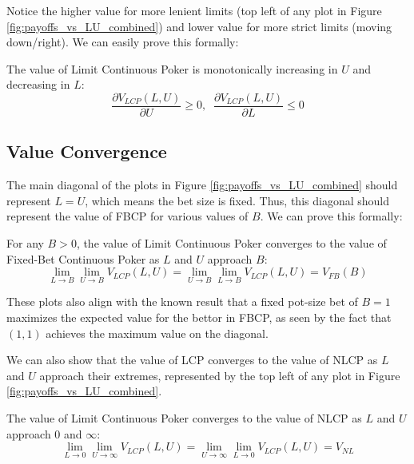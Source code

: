 \documentclass[../../main/main.tex]{subfiles}
\begin{document}
Notice the higher value for more lenient limits (top left of any plot in Figure \ref{fig:payoffs_vs_LU_combined}) and lower value for more strict limits (moving down/right). We can easily prove this formally:

\begin{theorem}
    The value of Limit Continuous Poker is monotonically increasing in $U$ and decreasing in $L$:
\[
    \frac{\partial V_{LCP}(L, U)}{\partial U} \geq 0, \;\; \frac{\partial V_{LCP}(L, U)}{\partial L} \leq 0
\]
\end{theorem}
\begin{customproof}
\end{customproof}

\subsection{Value Convergence}

The main diagonal of the plots in Figure \ref{fig:payoffs_vs_LU_combined} should represent $L=U$, which means the bet size is fixed. Thus, this diagonal should represent the value of FBCP for various values of $B$. We can prove this formally:

\begin{theorem}
    For any $B > 0$, the value of Limit Continuous Poker converges to the value of Fixed-Bet Continuous Poker as $L$ and $U$ approach $B$:
\[
\lim_{L \to B} \lim_{U \to B} V_{LCP}(L, U) = \lim_{U \to B} \lim_{L \to B} V_{LCP}(L, U) = V_{FB}(B)
\]
\end{theorem}

\begin{customproof}
\end{customproof}

These plots also align with the known result that a fixed pot-size bet of $B=1$ maximizes the expected value for the bettor in FBCP, as seen by the fact that $(1, 1)$ achieves the maximum value on the diagonal. 

We can also show that the value of LCP converges to the value of NLCP as $L$ and $U$ approach their extremes, represented by the top left of any plot in Figure \ref{fig:payoffs_vs_LU_combined}.

\begin{theorem}
    The value of Limit Continuous Poker converges to the value of NLCP as $L$ and $U$ approach $0$ and $\infty$:
\[
\lim_{L \to 0} \lim_{U \to \infty} V_{LCP}(L, U) = \lim_{U \to \infty} \lim_{L \to 0} V_{LCP}(L, U) = V_{NL}
\]
\end{theorem}
\begin{customproof}
\end{customproof}
\end{document}
